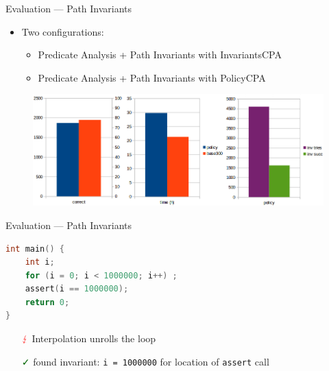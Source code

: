 \documentclass{beamer}
\begin{document}
\begin{frame}{Evaluation --- Path Invariants}
\begin{itemize}
\item Two configurations:
\begin{itemize}
 \item Predicate Analysis + Path Invariants with InvariantsCPA
 \item Predicate Analysis + Path Invariants with PolicyCPA
 \end{itemize}
\end{itemize}
\begin{adjustwidth}{-3.5em}{-3.5em}
\begin{figure}
 \centering
 \includegraphics[width=1.15\textwidth]{pathInv_diagram.png}
 \end{figure}
 \end{adjustwidth}
\end{frame}

\begin{frame}[fragile]{Evaluation --- Path Invariants}
 \begin{lstlisting}[language=C, frame=single]
 int main() {
    int i;
    for (i = 0; i < 1000000; i++) ;
    assert(i == 1000000);
    return 0;
}
\end{lstlisting}
\begin{itemize}
 \item[$\textcolor{red}{\lightning}$] Interpolation unrolls the loop
 \item[\textcolor{darkgreen}{✓}] found invariant: \texttt{i = 1000000} for location of \texttt{assert} call
\end{itemize}
\end{frame}
\end{document}
